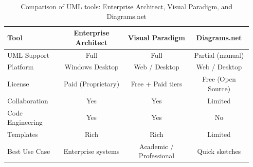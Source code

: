 \FloatBarrier
\begin{table}[ht]
\centering
\setlength{\tabcolsep}{4pt}
\begin{tabular}{|l|c|c|c|}
\hline
\textbf{Tool} & \textbf{Enterprise Architect} & \textbf{Visual Paradigm} & \textbf{Diagrams.net} \\
\hline
UML Support & Full & Full & Partial (manual) \\
\hline
Platform & Windows Desktop & Web / Desktop & Web / Desktop \\
\hline
License & Paid (Proprietary) & Free + Paid tiers & Free (Open Source) \\
\hline
Collaboration & Yes & Yes & Limited \\
\hline
Code Engineering & Yes & Yes & No \\
\hline
Templates & Rich & Rich & Limited \\
\hline
Best Use Case & Enterprise systems & Academic / Professional & Quick sketches \\
\hline
\end{tabular}
\caption{Comparison of UML tools: Enterprise Architect, Visual Paradigm, and Diagrams.net}
\label{tab:uml_tool_comparison}
\end{table}
\FloatBarrier